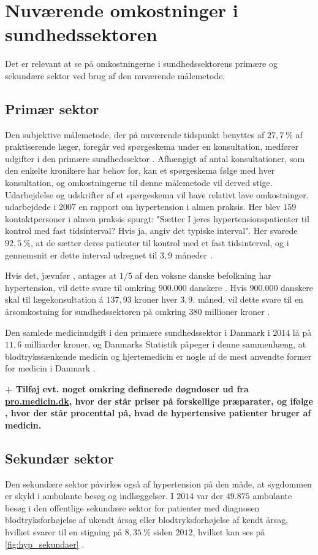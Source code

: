 \section{Nuværende omkostninger i sundhedssektoren}
Det er relevant at se på omkostningerne i sundhedssektorens primære og sekundære sektor ved brug af den nuværende målemetode. 

\subsection{Primær sektor} \label{sec:nuv_primaer}
Den subjektive målemetode, der på nuværende tidspunkt benyttes af $27,7~\%$ af praktiserende læger, foregår ved spørgeskema under en konsultation, medfører udgifter i den primære sundhedssektor \citep{munck2007}. Afhængigt af antal konsultationer, som den enkelte kronikere har behov for, kan et spørgeskema følge med hver konsultation, og omkostningerne til denne målemetode vil derved stige. Udarbejdelse og udskrifter af et spørgeskema vil have relativt lave omkostninger.
\citeauthor{munck2007} udarbejdede i 2007 en rapport om hypertension i almen praksis. Her blev $159$ kontaktpersoner i almen praksis spurgt: "Sætter I jeres hypertensionspatienter til kontrol med fast tidsinterval? Hvis ja, angiv det typiske interval". Her svarede $92,5~\%$, at de sætter deres patienter til kontrol med et fast tidsinterval, og i gennemsnit er dette interval udregnet til $3,9$ måneder \citep{munck2007}. 

Hvis det, jævnfør \citeauthor{kronborg2008}, antages at $1/5$ af den voksne danske befolkning har hypertension, vil dette svare til omkring $900.000$ danskere \citep{folketal2016}. Hvis $900.000$ danskere skal til lægekonsultation á $137,93$ kroner hver $3,9$. måned, vil dette svare til en årsomkostning for sundhedssektoren på omkring $380$ millioner kroner \citep{honorartabel2016}. 

Den samlede medicinudgift i den primære sundhedssektor i Danmark i $2014$ lå på $11,6$ milliarder kroner, og Danmarks Statistik påpeger i denne sammenhæng, at blodtrykssænkende medicin og hjertemedicin er nogle af de mest anvendte former for medicin i Danmark \citep{dst2016}. 

\textbf{+ Tilføj evt. noget omkring definerede døgndoser ud fra \url{pro.medicin.dk}, hvor der står priser på forskellige præparater, og ifølge \citeauthor{munck2007}, hvor der står procenttal på, hvad de hypertensive patienter bruger af medicin. }

\subsection{Sekundær sektor}
Den sekundære sektor påvirkes også af hypertension på den måde, at sygdommen er skyld i ambulante besøg og indlæggelser. I $2014$ var der $49.875$ ambulante besøg i den offentlige sekundære sektor for patienter med diagnosen blodtryksforhøjelse af ukendt årsag eller blodtryksforhøjelse af kendt årsag, hvilket svarer til en stigning på $8,35~\%$ siden $2012$, hvilket kan ses på \autoref{fig:hyp_sekundaer} \citep{sundhedsdatastyrelsen2016}. 

